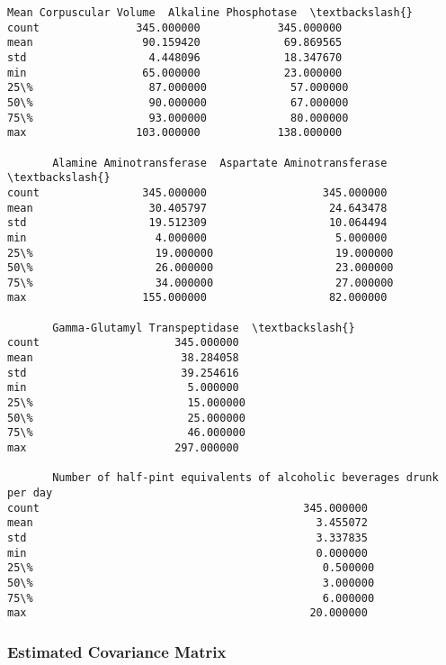 \documentclass[11pt]{article}
\makeatletter
\newcommand{\boxspacing}{\kern\kvtcb@left@rule\kern\kvtcb@boxsep}
\newcommand{\prompt}[4]{
        {\ttfamily\llap{{\color{#2}[#3]:\hspace{3pt}#4}}\vspace{-\baselineskip}}
    }
\makeatother
\begin{document}
            \begin{tcolorbox}[breakable, size=fbox, boxrule=.5pt, pad at break*=1mm, opacityfill=0]
\prompt{Out}{outcolor}{13}{\boxspacing}
\begin{Verbatim}[commandchars=\\\{\}]
       Mean Corpuscular Volume  Alkaline Phosphotase  \textbackslash{}
count               345.000000            345.000000
mean                 90.159420             69.869565
std                   4.448096             18.347670
min                  65.000000             23.000000
25\%                  87.000000             57.000000
50\%                  90.000000             67.000000
75\%                  93.000000             80.000000
max                 103.000000            138.000000

       Alamine Aminotransferase  Aspartate Aminotransferase  \textbackslash{}
count                345.000000                  345.000000
mean                  30.405797                   24.643478
std                   19.512309                   10.064494
min                    4.000000                    5.000000
25\%                   19.000000                   19.000000
50\%                   26.000000                   23.000000
75\%                   34.000000                   27.000000
max                  155.000000                   82.000000

       Gamma-Glutamyl Transpeptidase  \textbackslash{}
count                     345.000000
mean                       38.284058
std                        39.254616
min                         5.000000
25\%                        15.000000
50\%                        25.000000
75\%                        46.000000
max                       297.000000

       Number of half-pint equivalents of alcoholic beverages drunk per day
count                                         345.000000
mean                                            3.455072
std                                             3.337835
min                                             0.000000
25\%                                             0.500000
50\%                                             3.000000
75\%                                             6.000000
max                                            20.000000
\end{Verbatim}
\end{tcolorbox}
        
    \hypertarget{estimated-covariance-matrix}{%
\subsubsection*{Estimated Covariance
Matrix}\label{estimated-covariance-matrix}}
\end{document}
